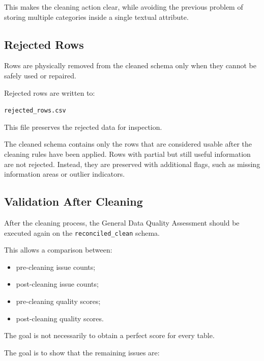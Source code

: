 \documentclass[a4paper,11pt]{article}
\begin{document}
	This makes the cleaning action clear, while avoiding the previous problem of storing multiple categories inside a single textual attribute.
	
	\subsection{Rejected Rows}
	
	Rows are physically removed from the cleaned schema only when they cannot be safely used or repaired.
	

	Rejected rows are written to:
	
	\begin{center}
		\texttt{rejected\_rows.csv}
	\end{center}
	
	This file preserves the rejected data for inspection.
	
	The cleaned schema contains only the rows that are considered usable after the cleaning rules have been applied.
	Rows with partial but still useful information are not rejected. Instead, they are preserved with additional flags, such as missing information areas or outlier indicators.
	
	\subsection{Validation After Cleaning}
	
	After the cleaning process, the General Data Quality Assessment should be executed again on the \texttt{reconciled\_clean} schema.
	
	This allows a comparison between:
	
	\begin{itemize}[leftmargin=1.2cm]
		\item pre-cleaning issue counts;
		\item post-cleaning issue counts;
		\item pre-cleaning quality scores;
		\item post-cleaning quality scores.
	\end{itemize}
	
	The goal is not necessarily to obtain a perfect score for every table.
	
	The goal is to show that the remaining issues are:
	
\end{document}
